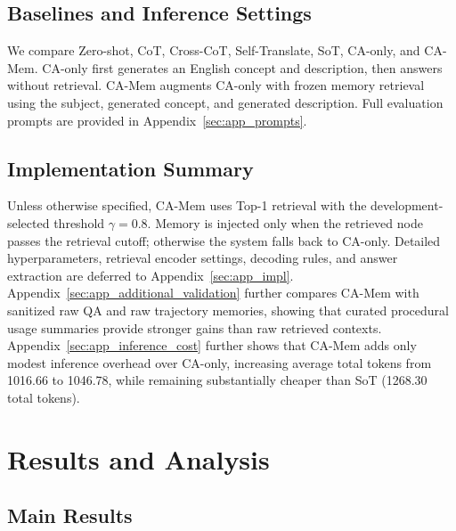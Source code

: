 \documentclass[11pt]{article}
\begin{document}
\subsection{Baselines and Inference Settings}
We compare Zero-shot, CoT, Cross-CoT, Self-Translate, SoT, CA-only, and CA-Mem. CA-only first generates an English concept and description, then answers without retrieval. CA-Mem augments CA-only with frozen memory retrieval using the subject, generated concept, and generated description. Full evaluation prompts are provided in Appendix~\ref{sec:app_prompts}.

\subsection{Implementation Summary}
Unless otherwise specified, CA-Mem uses Top-1 retrieval with the development-selected threshold $\gamma = 0.8$. Memory is injected only when the retrieved node passes the retrieval cutoff; otherwise the system falls back to CA-only. Detailed hyperparameters, retrieval encoder settings, decoding rules, and answer extraction are deferred to Appendix~\ref{sec:app_impl}.
Appendix~\ref{sec:app_additional_validation} further compares CA-Mem with sanitized raw QA and raw trajectory memories, showing that curated procedural usage summaries provide stronger gains than raw retrieved contexts.
Appendix~\ref{sec:app_inference_cost} further shows that CA-Mem adds only modest inference overhead over CA-only, increasing average total tokens from 1016.66 to 1046.78, while remaining substantially cheaper than SoT (1268.30 total tokens).

\section{Results and Analysis}
\label{sec:results}

\subsection{Main Results}
\end{document}
